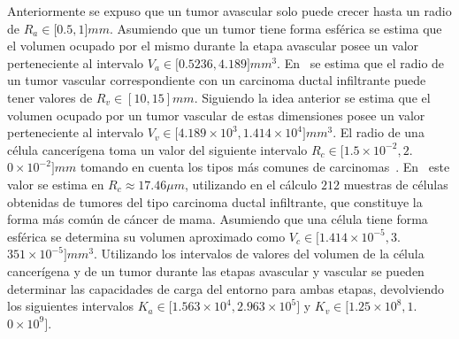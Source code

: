 \begin{table}[!ht]
\begin{center}
\vspace*{-0.5cm}
\end{center}
\caption[Par\'ametros correspondientes con la ley de crecimiento log\'istico]{Par\'ametros correspondientes con la ley de crecimiento log\'istico.}
\label{table-logistic-params}
\end{table}

Anteriormente se expuso que un tumor avascular solo puede crecer hasta un radio de $R_a \in [0$.$5, 1]mm$. Asumiendo que un tumor tiene forma esf\'erica se estima que el volumen ocupado por el mismo durante la etapa avascular posee un valor perteneciente al intervalo $V_a \in [0$.$5236, 4$.$189]mm^3$. En~\cite{breastdata,chile} se estima que el radio de un tumor vascular correspondiente con un carcinoma ductal infiltrante puede tener valores de $R_v \in [10, 15]mm$. Siguiendo la idea anterior se estima que el volumen ocupado por un tumor vascular de estas dimensiones posee un valor perteneciente al intervalo $V_v \in [4$.$189 \times 10^3, 1$.$414 \times 10^4]mm^3$. El radio de una c\'elula cancer\'igena toma un valor del siguiente intervalo $R_c \in [1$.$5 \times 10^{-2}, 2$.$0 \times 10^{-2}]mm$ tomando en cuenta los tipos m\'as comunes de carcinomas~\cite{kansal3,breastdata,vajtai}. En~\cite{wisconsin} este valor se estima en $R_c \approx 17$.$46 \mu m$, utilizando en el c\'alculo $212$ muestras de c\'elulas obtenidas de tumores del tipo carcinoma ductal infiltrante, que constituye la forma m\'as com\'un de c\'ancer de mama. Asumiendo que una c\'elula tiene forma esf\'erica se determina su volumen aproximado como $V_{c} \in [1$.$414 \times 10^{-5}, 3$.$351 \times 10^{-5}]mm^3$. Utilizando los intervalos de valores del volumen de la c\'elula cancer\'igena y de un tumor durante las etapas avascular y vascular se pueden determinar las capacidades de carga del entorno para ambas etapas, devolviendo los siguientes intervalos $K_a \in [1$.$563 \times 10^4, 2$.$963 \times 10^5]$ y $K_v \in [1$.$25 \times 10^8, 1$.$0 \times 10^9]$.

